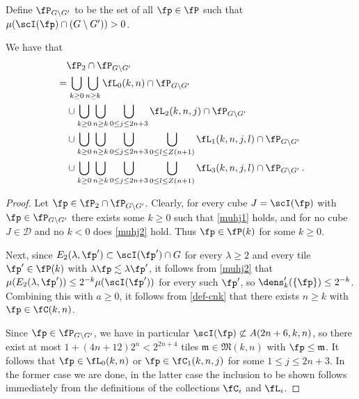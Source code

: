 Define $\fP_{G \setminus G'}$ to be the set of all $\fp \in \fP$ such that $\mu(\scI(\fp) \cap (G \setminus  G')) > 0$.
\begin{lemma}
    \label{antichain-decomposition}
    \leanok
    We have that
    \begin{align}
        \label{eq-fp'-decomposition}
        &\quad \fP_2 \cap \fP_{G \setminus G'}\\
        &= \bigcup_{k \ge 0} \bigcup_{n \ge k} \fL_0(k,n) \cap \fP_{G \setminus G'} \\
        &\quad\cup \bigcup_{k \ge 0} \bigcup_{n \ge k}\bigcup_{0 \le j \le 2n+3} \fL_2(k,n,j) \cap \fP_{G \setminus G'}\\
        &\quad\cup \bigcup_{k \ge 0} \bigcup_{n \ge k}\bigcup_{0 \le j \le 2n+3} \bigcup_{0 \le l \le Z(n+1)} \fL_1(k,n,j,l) \cap \fP_{G \setminus G'}\\
        &\quad\cup \bigcup_{k \ge 0} \bigcup_{n \ge k}\bigcup_{0 \le j \le 2n+3} \bigcup_{0 \le l \le Z(n+1)} \fL_3(k,n,j,l)\cap \fP_{G \setminus G'}\,.
    \end{align}
\end{lemma}

\begin{proof}
    Let $\fp \in \fP_2 \cap \fP_{G \setminus G'}$. Clearly, for every cube $J = \scI(\fp)$ with $\fp \in \fP_{G \setminus G'}$ there exists some $k \ge 0$ such that \eqref{muhj1} holds, and for no cube $J \in \mathcal{D}$ and no $k < 0$ does \eqref{muhj2} hold. Thus $\fp \in \fP(k)$ for some $k \ge 0$.

    Next, since $E_2(\lambda, \fp') \subset \scI(\fp')\cap G$ for every $\lambda \ge 2$ and every tile $\fp' \in \fP(k)$ with $\lambda\fp \lesssim \lambda \fp'$, it follows from \eqref{muhj2} that $\mu(E_2(\lambda, \fp')) \le 2^{-k} \mu(\scI(\fp'))$ for every such $\fp'$, so $\dens_k'(\{\fp\}) \le 2^{-k}$. Combining this with $a \ge 0$, it follows from \eqref{def-cnk} that there exists $n\ge k$ with $\fp \in \fC(k,n)$.

    Since $\fp \in \fP_{G \setminus G'}$, we have in particular $\scI(\fp) \not \subset A(2n + 6, k, n)$, so there exist at most $1 + (4n + 12)2^n < 2^{2n+4}$ tiles $\mathfrak{m} \in \mathfrak{M}(k,n)$ with $\fp \le \mathfrak{m}$. It follows that $\fp \in \fL_0(k,n)$ or $\fp \in \fC_1(k,n,j)$ for some $1 \le j \le 2n + 3$. In the former case we are done, in the latter case the inclusion to be shown follows immediately from the definitions of the collections $\fC_i$ and $\fL_i$.
\end{proof}


